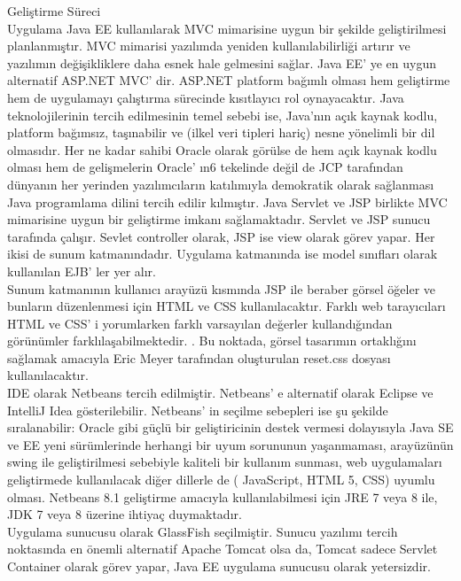 Geliştirme Süreci \\
Uygulama Java EE kullanılarak MVC mimarisine uygun bir şekilde geliştirilmesi
planlanmıştır. MVC mimarisi yazılımda yeniden kullanılabilirliği artırır ve yazılımın
değişikliklere daha esnek hale gelmesini sağlar\cite{mvc}. Java EE’ ye en uygun alternatif
ASP.NET MVC' dir. ASP.NET platform bağımlı olması hem geliştirme hem de
uygulamayı çalıştırma sürecinde kısıtlayıcı rol oynayacaktır. Java teknolojilerinin tercih
edilmesinin temel sebebi ise, Java'nın açık kaynak kodlu, platform bağımsız, taşınabilir
ve (ilkel veri tipleri hariç) nesne yönelimli bir dil olmasıdır\cite{javaNesne}. Her ne kadar sahibi
Oracle olarak görülse de hem açık kaynak kodlu olması hem de gelişmelerin Oracle' ın6
tekelinde değil de JCP tarafından dünyanın her yerinden yazılımcıların katılımıyla
demokratik olarak sağlanması Java programlama dilini tercih edilir kılmıştır\cite{jcp}.
Java Servlet ve JSP birlikte MVC mimarisine uygun bir geliştirme imkanı
sağlamaktadır. Servlet ve JSP sunucu tarafında çalışır. Sevlet controller olarak, JSP ise
view olarak görev yapar. Her ikisi de sunum katmanındadır. Uygulama katmanında ise
model sınıfları olarak kullanılan EJB’ ler yer alır.
\\
Sunum katmanının kullanıcı arayüzü kısmında JSP ile beraber görsel öğeler ve bunların
düzenlenmesi için HTML ve CSS kullanılacaktır. Farklı web tarayıcıları HTML ve
CSS’
i
yorumlarken
farklı
varsayılan
değerler
kullandığından
görünümler
farklılaşabilmektedir. . Bu noktada, görsel tasarımın ortaklığını sağlamak amacıyla Eric
Meyer tarafından oluşturulan reset.css dosyası\cite{resetCSS} kullanılacaktır.
\\
IDE olarak Netbeans tercih edilmiştir. Netbeans' e alternatif olarak Eclipse ve IntelliJ
Idea gösterilebilir. Netbeans' in seçilme sebepleri ise şu şekilde sıralanabilir: Oracle gibi
güçlü bir geliştiricinin destek vermesi dolayısıyla Java SE ve EE yeni sürümlerinde
herhangi bir uyum sorununun yaşanmaması, arayüzünün swing ile geliştirilmesi
sebebiyle kaliteli bir kullanım sunması, web uygulamaları geliştirmede kullanılacak
diğer dillerle de ( JavaScript, HTML 5, CSS) uyumlu olması\cite{nedenNetbeans}. Netbeans 8.1
geliştirme amacıyla kullanılabilmesi için JRE 7 veya 8 ile, JDK 7 veya 8 üzerine ihtiyaç
duymaktadır\cite{netbeansJDKGereksinim}.
\\
Uygulama sunucusu olarak GlassFish seçilmiştir. Sunucu yazılımı tercih noktasında en
önemli alternatif Apache Tomcat olsa da, Tomcat sadece Servlet Container olarak görev
yapar, Java EE uygulama sunucusu olarak yetersizdir\cite{tomcat}.
